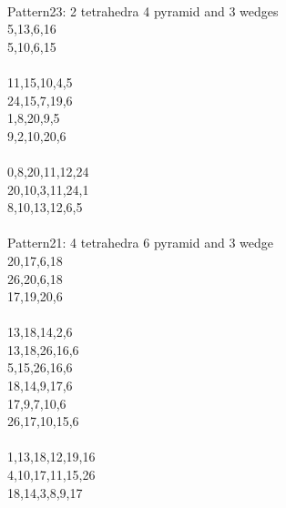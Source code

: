 \documentclass[twocolumn]{article}
\begin{document}
 \\
\tiny  Pattern23: 2 tetrahedra 4 pyramid and 3 wedges\\
\tiny  5,13,6,16 \\
\tiny  5,10,6,15 \\
\tiny   \\
\tiny  11,15,10,4,5 \\
\tiny  24,15,7,19,6 \\
\tiny  1,8,20,9,5 \\
\tiny  9,2,10,20,6 \\
\tiny   \\
\tiny  0,8,20,11,12,24 \\
\tiny  20,10,3,11,24,1 \\
\tiny  8,10,13,12,6,5 \\

 \\
\tiny  Pattern21: 4 tetrahedra 6 pyramid and 3 wedge\\
\tiny  20,17,6,18 \\
\tiny  26,20,6,18 \\
\tiny  17,19,20,6 \\
\tiny   \\
\tiny  13,18,14,2,6 \\
\tiny  13,18,26,16,6 \\
\tiny  5,15,26,16,6 \\
\tiny  18,14,9,17,6 \\
\tiny  17,9,7,10,6 \\
\tiny  26,17,10,15,6 \\
\tiny   \\
\tiny  1,13,18,12,19,16 \\
\tiny  4,10,17,11,15,26 \\
\tiny  18,14,3,8,9,17 \\
\tiny   \\
\tiny   \\
\end{document}
